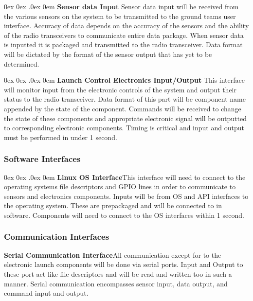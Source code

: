 \documentclass[10pt,draftclsnofoot,onecolumn,compsoc]{IEEEtran}
\makeatletter
\renewcommand\paragraph{\@startsection{paragraph}{4}{\z@}%
                                    {0ex \@plus0ex \@minus.0ex}%
                                    {0em}%
                                    {\normalfont\normalsize\bfseries}}
\makeatother
\begin{document}
\paragraph{\bf Sensor data Input}
Sensor data input will be received from the various sensors on the system to be transmitted to the ground teams user interface. Accuracy of data depends on the accuracy of the sensors and the ability of the radio transceivers to communicate entire data package. When sensor data is inputted it is packaged and transmitted to the radio transceiver. Data format will be dictated by the format of the sensor output that has yet to be determined.

\paragraph{\bf Launch Control Electronics Input/Output}
This interface will monitor input from the electronic controls of the system and output their status to the radio transceiver. Data format of this part will be component name appended by the state of the component. Commands will be received to change the state of these components and appropriate electronic signal will be outputted to corresponding electronic components. Timing is critical and input and output must be performed in under 1 second.


\subsubsection{Software Interfaces}
\paragraph{\bf Linux OS Interface}This interface will need to connect to the operating systems file descriptors and GPIO lines in order to communicate to sensors and electronics components. Inputs will be from OS and API interfaces to the operating system. These are prepackaged and will be connected to in software. Components will need to connect to the OS interfaces within 1 second. 

\subsubsection{Communication Interfaces}
{\bf Serial Communication Interface}All communication except for to the electronic launch components will be done via serial ports. Input and Output to these port act like file descriptors and will be read and written too in such a manner. Serial communication encompasses sensor input, data output, and command input and output.
\end{document}
